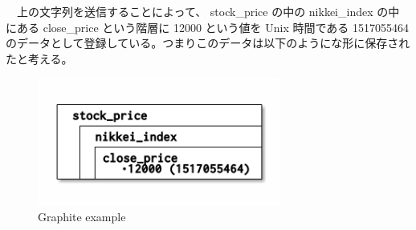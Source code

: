 \documentclass[dvipdfmx]{scrartcl}
\begin{document}
　上の文字列を送信することによって、 stock\_price の中の nikkei\_index の中にある close\_price という階層に 12000 という値を Unix 時間である 1517055464 のデータとして登録している。つまりこのデータは以下のようにな形に保存されたと考える。\\

\begin{figure}[htbp]
\centering
\includegraphics[width=8cm]{hoge.png}
\caption{Graphite example}
\end{figure}
\end{document}
